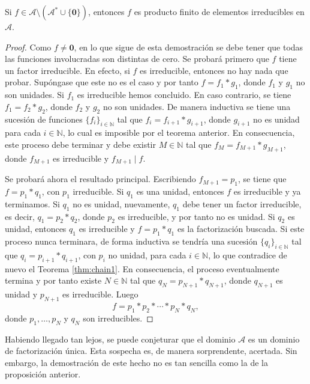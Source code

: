 \begin{proposition}
Si $f \in \mathcal{A}\setminus (\mathcal{A}^* \cup \{ \mathbf{0} \})$, entonces $f$ es producto finito de elementos irreducibles en $\mathcal{A}$.
\end{proposition}
\begin{proof}
Como $f \ne \mathbf{0}$, en lo que sigue de esta demostración se debe tener que todas las funciones involucradas son distintas de cero. Se probará primero que $f$ tiene un factor irreducible. En efecto, si $f$ es irreducible, entonces no hay nada que probar. Supóngase que este no es el caso y por tanto $f=f_1*g_1$, donde $f_1$ y $g_1$ no son unidades. Si $f_1$ es irreducible hemos concluido. En caso contrario, se tiene $f_1=f_2*g_2$, donde $f_2$ y $g_2$ no son unidades. De manera inductiva se tiene una sucesión de funciones $\{ f_i \}_{i \in \mathbb{N}}$ tal que $f_i=f_{i+1}*g_{i+1}$, donde $g_{i+1}$ no es unidad para cada $i \in \mathbb{N}$, lo cual es imposible por el teorema anterior. En consecuencia, este proceso debe terminar y debe existir $M \in \mathbb{N}$ tal que $f_M=f_{M+1}*g_{M+1}$, donde $f_{M+1}$ es irreducible y $f_{M+1} \mid f$.
\bigskip

Se probará ahora el resultado principal. Escribiendo $f_{M+1}=p_1$, se tiene que $f=p_1*q_1$, con $p_1$ irreducible. Si $q_1$ es una unidad, entonces $f$ es irreducible y ya terminamos. Si $q_1$ no es unidad, nuevamente, $q_1$ debe tener un factor irreducible, es decir, $q_1=p_2*q_2$, donde $p_2$ es irreducible, y por tanto no es unidad. Si $q_2$ es unidad, entonces $q_1$ es irreducible y $f=p_1*q_1$ es la factorización buscada. Si este proceso nunca terminara, de forma inductiva se tendría una sucesión $\{ q_i \}_{i \in \mathbb{N}}$ tal que $q_i=p_{i+1}*q_{i+1}$, con $p_i$ no unidad, para cada $i \in \mathbb{N}$, lo que contradice de nuevo el Teorema \ref{thm:chain1}. En consecuencia, el proceso eventualmente termina y por tanto existe $N \in \mathbb{N}$ tal que $q_N=p_{N+1}*q_{N+1}$, donde $q_{N+1}$ es unidad y $p_{N+1}$ es irreducible. Luego
\begin{equation*}
    f=p_1*p_2*\cdots*p_N*q_N,
\end{equation*}
donde $p_1,\ldots,p_{N}$ y $q_N$ son irreducibles.
\end{proof}

Habiendo llegado tan lejos, se puede conjeturar que el dominio $\mathcal{A}$ es un dominio de factorización única. Esta sospecha es, de manera sorprendente, acertada. Sin embargo, la demostración de este hecho no es tan sencilla como la de la proposición anterior.

